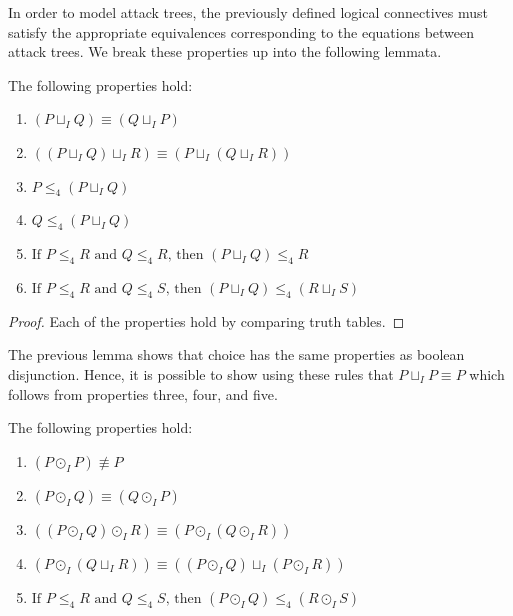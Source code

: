 \documentclass{llncs}
\begin{document}
In order to model attack trees, the previously defined logical
connectives must satisfy the appropriate equivalences corresponding to
the equations between attack trees.  We break these properties up into
the following lemmata.

\begin{lemma}
  \label{lemma:basic_properties_for_choice}
  The following properties hold:
  \begin{enumerate}
  \item $(P \sqcup_I Q) \equiv (Q \sqcup_I P)$\\[-5px]
  \item $((P \sqcup_I Q) \sqcup_I R) \equiv (P \sqcup_I (Q \sqcup_I R))$\\[-5px]
  \item $P \leq_4 (P \sqcup_I Q)$\\[-5px]
  \item $Q \leq_4 (P \sqcup_I Q)$\\[-5px]
  \item $\text{If }P \leq_4 R \text{ and } Q \leq_4 R \text{, then } (P \sqcup_I Q) \leq_4 R$\\[-5px]
  \item $\text{If }P \leq_4 R \text{ and } Q \leq_4 S \text{, then } (P \sqcup_I Q) \leq_4 (R \sqcup_I S)$
  \end{enumerate}
\end{lemma}
\begin{proof}
  Each of the properties hold by comparing truth tables.
\end{proof}
The previous lemma shows that choice has the same properties as
boolean disjunction.  Hence, it is possible to show using these rules
that $P \sqcup_I P \equiv P$ which follows from properties three,
four, and five.
\begin{lemma}
  \label{lemma:basic_properties_for_parallel}
  The following properties hold:
  \begin{enumerate}
  \item $(P \odot_I P) \not\equiv P$\\[-5px]
  \item $(P \odot_I Q) \equiv (Q \odot_I P)$\\[-5px]
  \item $((P \odot_I Q) \odot_I R) \equiv (P \odot_I (Q \odot_I R))$\\[-5px]
  \item $(P \odot_I (Q \sqcup_I R)) \equiv ((P \odot_I Q) \sqcup_I (P \odot_I R))$\\[-5px]
  \item $\text{If }P \leq_4 R \text{ and } Q \leq_4 S \text{, then } (P \odot_I Q) \leq_4 (R \odot_I S)$
  \end{enumerate}
\end{lemma}
\end{document}
